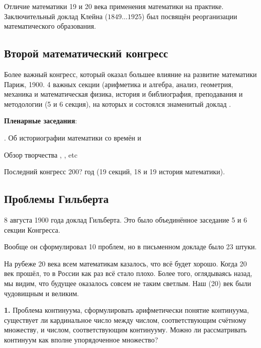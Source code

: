 \documentclass[a4paper,oneside,fleqn,10pt]{article}
\newcommand{\pe}[2]{${#1}\ldots{#2}$}
\begin{document}
Отличие математики 19 и 20 века применения математики на практике.
Заключительный доклад Клейна (\pe{1849}{1925}) был посвящён
реорганизации математического образования.

\subsection{Второй математический конгресс}

Более важный конгресс, который оказал большее влияние на развитие
математики Париж, 1900.  4 важных секции (арифметика и алгебра,
анализ, геометрия, механика и математическая физика, история и
библиография, преподавания и методологии (5 и 6 секция), на которых и
состоялся знаменитый доклад .

\textbf{Пленарные заседания}:

\begin{items}{-2}
\item {}. Об историографии математики
  со времён  и 
\item {} Обзор творчества ,
  , etc
\item {}
\end{items}

Последний конгресс 200? год (19 секций, 18 и 19 история математики).

\subsection{Проблемы Гильберта}

8 августа 1900 года доклад Гильберта.  Это было объединённое заседание
5 и 6 секции Конгресса.

Вообще он сформулировал 10 проблем, но в письменном докладе было 23
штуки.

На рубеже 20 века всем математикам казалось, что всё будет
хорошо. Когда 20 век прошёл, то в России как раз всё стало
плохо. Более того, оглядываясь назад, мы видим, что будущее оказалось
совсем не таким светлым. Наш (20) век были чудовищным и великим.

\medskip

\textbf{1.} Проблема континуума, сформулировать арифметически понятие
континуума, существует ли кардинальное число между числом,
соответствующим счётному множеству, и числом, соответствующим
континууму. Можно ли рассматривать континуум как вполне упорядоченное
множество?
\end{document}
